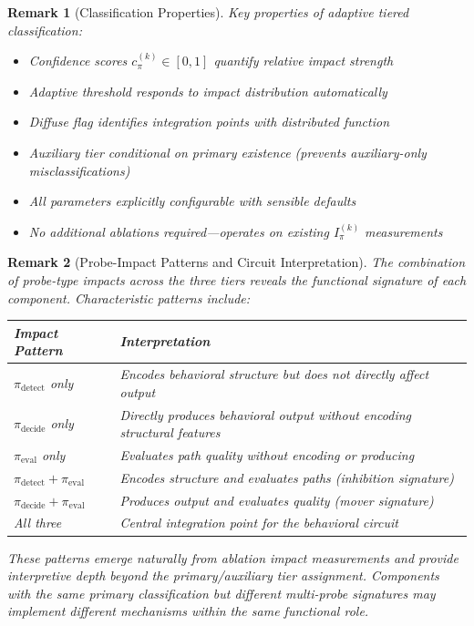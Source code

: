 \documentclass[11pt]{article}
\newtheorem{remark}{Remark}[section]
\begin{document}
\begin{remark}[Classification Properties]
\label{rem:classification-properties}
Key properties of adaptive tiered classification:
\begin{itemize}[nosep]
\item Confidence scores $c^{(k)}_\pi \in [0,1]$ quantify relative impact strength
\item Adaptive threshold responds to impact distribution automatically
\item Diffuse flag identifies integration points with distributed function
\item Auxiliary tier conditional on primary existence (prevents auxiliary-only misclassifications)
\item All parameters explicitly configurable with sensible defaults
\item No additional ablations required---operates on existing $I^{(k)}_\pi$ measurements
\end{itemize}
\end{remark}

\begin{remark}[Probe-Impact Patterns and Circuit Interpretation]
\label{rem:probe-impact-patterns-circuit-interpretation}
The combination of probe-type impacts across the three tiers reveals the functional signature of each component. Characteristic patterns include:
\begin{center}
\begin{tabular}{lp{}}
\toprule
\textbf{Impact Pattern} & \textbf{Interpretation} \\
\midrule
$\pi_{\text{detect}}$ only & Encodes behavioral structure but does not directly affect output \\
$\pi_{\text{decide}}$ only & Directly produces behavioral output without encoding structural features \\
$\pi_{\text{eval}}$ only & Evaluates path quality without encoding or producing \\
$\pi_{\text{detect}} + \pi_{\text{eval}}$ & Encodes structure and evaluates paths (inhibition signature) \\
$\pi_{\text{decide}} + \pi_{\text{eval}}$ & Produces output and evaluates quality (mover signature) \\
All three & Central integration point for the behavioral circuit \\
\bottomrule
\end{tabular}
\end{center}
These patterns emerge naturally from ablation impact measurements and provide interpretive depth beyond the primary/auxiliary tier assignment. Components with the same primary classification but different multi-probe signatures may implement different mechanisms within the same functional role.
\end{remark}
\end{document}
